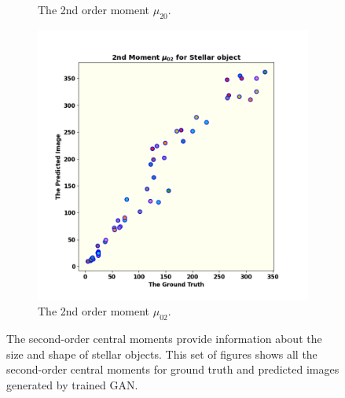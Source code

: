 \begin{figure}
\begin{subfigure}{0.33\linewidth}
		\caption{The 2nd order moment $\mu_{20}$.}
		\label{fig:mom5}
	\end{subfigure}\hfill
	\begin{subfigure}{0.33\linewidth}
		\includegraphics[width=\linewidth]{fig/moments/mom5.png}
		\caption{The 2nd order moment $\mu_{02}$.}
		\label{fig:mom6}
	\end{subfigure}\hfill
	\caption{The second-order central moments provide information about the size and shape of stellar objects. This set of figures shows all the second-order central moments for ground truth and predicted images generated by trained GAN.}
	\label{fig:struc}
\end{figure}
